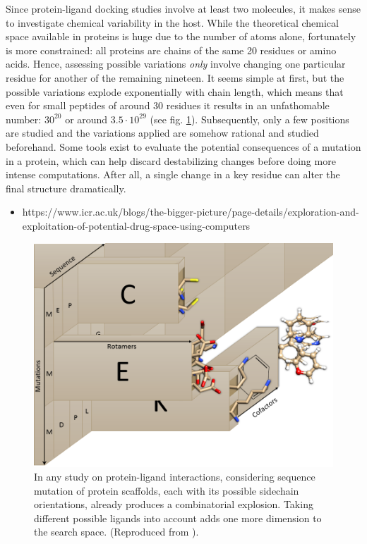 Since protein-ligand docking studies involve at least two molecules, it makes sense to investigate chemical variability in the host. While the theoretical chemical space available in proteins is huge due to the number of atoms alone, fortunately is more constrained: all proteins are chains of the same 20 residues or amino acids. Hence, assessing possible variations \textit{only} involve changing one particular residue for another of the remaining nineteen. It seems simple at first, but the possible variations explode exponentially with chain length, which means that even for small peptides of around 30 residues it results in an unfathomable number: $ 30^{20} $ or around $ 3.5·10^{29} $ (see fig. \ref{fig:chemicalspace}). Subsequently, only a few positions are studied and the variations applied are somehow rational and studied beforehand. Some tools exist to evaluate the potential consequences of a mutation in a protein,\cite{kumar2009predicting,quan2016strum,fariselli2015inps,dehouck2011popmusic} which can help discard destabilizing changes before doing more intense computations. After all, a single change in a key residue can alter the final structure dramatically.\cite{kumar2006protherm}

\begin{itemize}
	\item https://www.icr.ac.uk/blogs/the-bigger-picture/page-details/exploration-and-exploitation-of-potential-drug-space-using-computers
\end{itemize}

\begin{figure}[H]
	\includegraphics[width=\textwidth]{./figures/02/chemical_space.png}
	\caption[Chemobiological spaces]{
		In any study on protein-ligand interactions, considering sequence mutation of protein scaffolds, each with its possible sidechain orientations, already produces a combinatorial explosion. Taking different possible ligands into account adds one more dimension to the search space. (Reproduced from \citet{wileybook}).
	}
	\label{fig:chemicalspace}
\end{figure}

